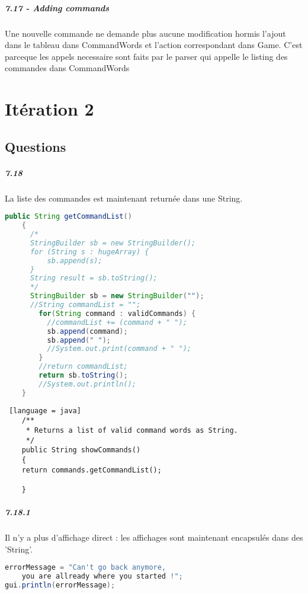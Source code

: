\documentclass[11pt,a4paper]{report}
\begin{document}
\paragraph{7.17 - Adding commands}
Une nouvelle commande ne demande plus aucune modification hormis l'ajout dans le tableau dans CommandWords et l'action correspondant dans Game. C'est parceque les appels necessaire sont faits par le parser qui appelle le listing des commandes dans CommandWords

\chapter{Itération 2}
\section{Questions}
\paragraph{7.18}
La liste des commandes est maintenant returnée dans une String.
\begin{lstlisting}[language = java]
public String getCommandList()
    {
      /*
      StringBuilder sb = new StringBuilder();
      for (String s : hugeArray) {
          sb.append(s);
      }
      String result = sb.toString();
      */
      StringBuilder sb = new StringBuilder("");
      //String commandList = "";
        for(String command : validCommands) {
          //commandList += (command + " ");
          sb.append(command);
          sb.append(" ");
          //System.out.print(command + " ");
        }
        //return commandList;
        return sb.toString();
        //System.out.println();
    }
\end{lstlisting}

\begin{lstlisting} [language = java]
    /**
     * Returns a list of valid command words as String.
     */
    public String showCommands()
    {
    return commands.getCommandList();

    }
\end{lstlisting}

\paragraph{7.18.1}
Il n'y a plus d'affichage direct : les affichages sont maintenant encapsulés dans des 'String'.
\begin{lstlisting}[language = java]
errorMessage = "Can't go back anymore, 
	you are allready where you started !";
gui.println(errorMessage);
\end{lstlisting}
\end{document}
